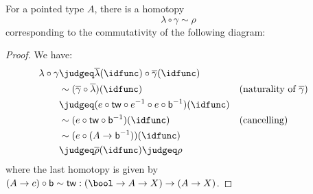 \documentclass{article}
\newcommand{\smsh}{\wedge}
\renewcommand{\o}{\ensuremath{\circ}}
\newcommand{\sy}{^{-1}}
\newcommand{\rhobar}{\overline{\rho}}
\newcommand{\lambdabar}{\overline{\lambda}}
\newcommand{\gammabar}{\overline{\gamma}}
\newcommand{\two}{\mathsf{b}}
\newcommand{\twist}{\mathsf{tw}}
\begin{document}
\begin{thm}\label{thm:smash-braiding-unitors}
	For a pointed type $A$, there is a homotopy
	\[\lambda \o \gamma \sim \rho\]
	corresponding to the commutativity of the following diagram:
	\begin{center}
	\end{center}
\end{thm}
\begin{proof}
	We have:
	\begin{align*}
		\lambda \o \gamma
		&\judgeq \lambdabar(\idfunc) \o \gammabar(\idfunc)\\
		&\sim (\gammabar \o \lambdabar)(\idfunc) &&\text{(naturality of $\gammabar$)}\\
		&\judgeq (e \o \twist \o e\sy \o e \o \two\sy)(\idfunc)\\
		&\sim (e \o \twist \o \two\sy)(\idfunc) &&\text{(cancelling)}\\
		&\sim (e \o (A \to \two\sy))(\idfunc)\\
		&\judgeq \rhobar(\idfunc) \judgeq \rho
	\end{align*}		
	where the last homotopy is given by $(A \to c) \o \two \sim \twist : (\bool \to A \to X) \to (A \to X)$.
\end{proof}
\end{document}
